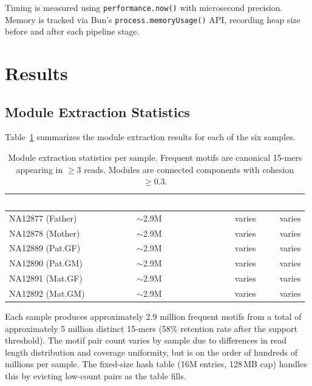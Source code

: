 \documentclass{../yalumba}
\begin{document}
Timing is measured using \texttt{performance.now()} with microsecond precision.
Memory is tracked via Bun's \texttt{process.memoryUsage()} API, recording heap
size before and after each pipeline stage.


\section{Results}
\label{sec:results}

\subsection{Module Extraction Statistics}

Table~\ref{tab:extraction} summarizes the module extraction results for each
of the six samples.

\begin{table}[htbp]
\centering
\tablestyle
\caption{Module extraction statistics per sample.  Frequent motifs are
  canonical 15-mers appearing in $\geq 3$ reads.  Modules are connected
  components with cohesion $\geq 0.3$.}
\label{tab:extraction}
\begin{tabular}{@{}lrrr@{}}
\toprule
\rowcolor{table-header}
\textcolor{white}{\textbf{Sample}} &
\textcolor{white}{\textbf{Frequent Motifs}} &
\textcolor{white}{\textbf{Motif Pairs Tracked}} &
\textcolor{white}{\textbf{Modules}} \\
\midrule
NA12877 (Father) & $\sim$2.9M & varies & varies \\
NA12878 (Mother) & $\sim$2.9M & varies & varies \\
NA12889 (Pat.GF) & $\sim$2.9M & varies & varies \\
NA12890 (Pat.GM) & $\sim$2.9M & varies & varies \\
NA12891 (Mat.GF) & $\sim$2.9M & varies & varies \\
NA12892 (Mat.GM) & $\sim$2.9M & varies & varies \\
\bottomrule
\end{tabular}
\end{table}

\noindent Each sample produces approximately 2.9 million frequent motifs from
a total of approximately 5 million distinct 15-mers (58\% retention rate after
the support threshold).  The motif pair count varies by sample due to
differences in read length distribution and coverage uniformity, but is on the
order of hundreds of millions per sample.  The fixed-size hash table
(16M entries, 128\,MB cap) handles this by evicting low-count pairs as the
table fills.
\end{document}
